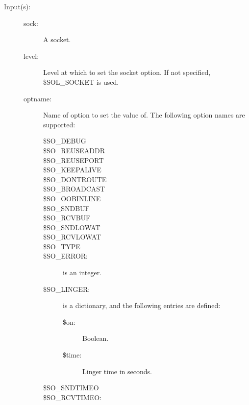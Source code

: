 \begin{description}
\begin{description}
\begin{verbatim}
		\end{verbatim}
	\end{description}
\label{systemdict:setsockopt}
\item[{\onyxop{sock level optname optval}{setsockopt}{--}}: ]
\item[{\onyxop{sock optname optval}{setsockopt}{--}}: ]
	\begin{description}\item[]
	\item[Input(s): ]
		\begin{description}\item[]
		\item[sock: ]
			A socket.
		\item[level: ]
			Level at which to set the socket option.  If not
			specified, \$SOL\_SOCKET is used.
		\item[optname: ]
			Name of option to set the value of.  The following
			option names are supported:
			\begin{description}%
			\item[\$SO\_DEBUG]
			\item[\$SO\_REUSEADDR]
			\item[\$SO\_REUSEPORT]
			\item[\$SO\_KEEPALIVE]
			\item[\$SO\_DONTROUTE]
			\item[\$SO\_BROADCAST]
			\item[\$SO\_OOBINLINE]
			\item[\$SO\_SNDBUF]
			\item[\$SO\_RCVBUF]
			\item[\$SO\_SNDLOWAT]
			\item[\$SO\_RCVLOWAT]
			\item[\$SO\_TYPE]
			\item[\$SO\_ERROR: ]
				 is an integer.
			\item[\$SO\_LINGER: ]
				 is a dictionary, and the
				following entries are defined:
				\begin{description}%
				\item[\$on: ]
					Boolean.
				\item[\$time: ]
					Linger time in seconds.
				\end{description}
			\item[\$SO\_SNDTIMEO]
			\item[\$SO\_RCVTIMEO: ]

\end{description}
\end{description}
\end{description}
\end{description}
